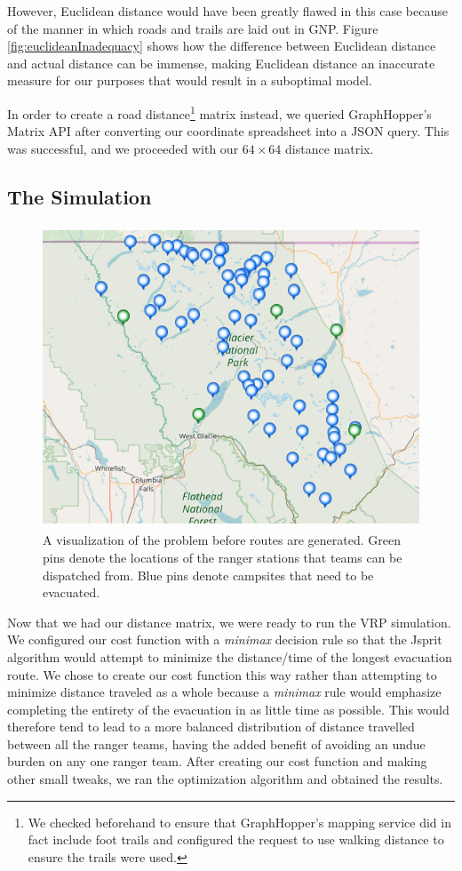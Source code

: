 \documentclass[12pt]{article}
\begin{document}
However, Euclidean distance would have been greatly flawed in this case because of the manner in which roads and trails are laid out in GNP. Figure \ref{fig:euclideanInadequacy} shows how the difference between Euclidean distance and actual distance can be immense, making Euclidean distance an inaccurate measure for our purposes that would result in a suboptimal model.

In order to create a road distance\footnote{We checked beforehand to ensure that GraphHopper's mapping service did in fact include foot trails and configured the request to use walking distance to ensure the trails were used.} matrix instead, we queried GraphHopper's Matrix API \cite{matrixAPI} after converting our coordinate spreadsheet \cite{campgroundCoordinates} into a JSON query. This was successful, and we proceeded with our $64 \times 64$ distance matrix.

\subsection{The Simulation}
\begin{figure}
    \centering
    \includegraphics[height=9cm]{"Ranger Problem Visualization 2"}
    \caption{A visualization of the problem before routes are generated. Green pins denote the locations of the ranger stations that teams can be dispatched from. Blue pins denote campsites that need to be evacuated.}
    \label{fig:my_label}
\end{figure}

Now that we had our distance matrix, we were ready to run the VRP simulation. We configured our cost function with a \textit{minimax} decision rule so that the Jsprit algorithm would attempt to minimize the distance/time of the longest evacuation route. We chose to create our cost function this way rather than attempting to minimize distance traveled as a whole because a \textit{minimax} rule would emphasize completing the entirety of the evacuation in as little time as possible. This would therefore tend to lead to a more balanced distribution of distance travelled between all the ranger teams, having the added benefit of avoiding an undue burden on any one ranger team. After creating our cost function and making other small tweaks, we ran the optimization algorithm and obtained the results.
\newpage
\end{document}
